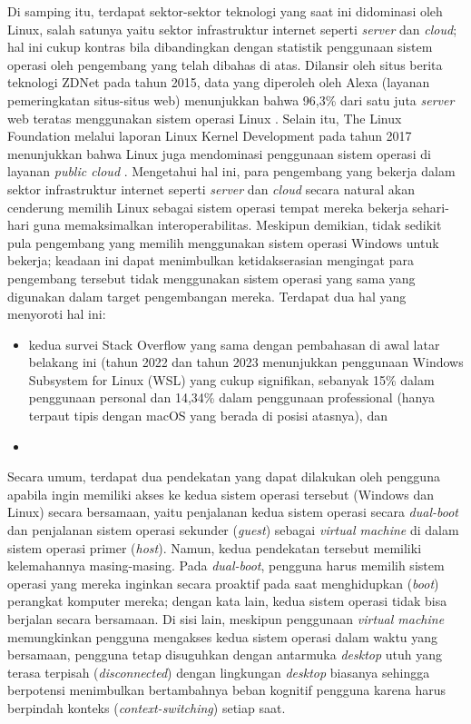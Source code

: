 Di samping itu, terdapat sektor-sektor teknologi yang saat ini didominasi oleh Linux, salah satunya yaitu sektor infrastruktur internet seperti \textit{server} dan \textit{cloud}; hal ini cukup kontras bila dibandingkan dengan statistik penggunaan sistem operasi oleh pengembang yang telah dibahas di atas. Dilansir oleh situs berita teknologi ZDNet pada tahun 2015, data yang diperoleh oleh Alexa (layanan pemeringkatan situs-situs web) menunjukkan bahwa 96,3\% dari satu juta \textit{server} web teratas menggunakan sistem operasi Linux \cite{zdnet-alexa-website-ranking-linux-dominance}. Selain itu, The Linux Foundation melalui laporan Linux Kernel Development pada tahun 2017 menunjukkan bahwa Linux juga mendominasi penggunaan sistem operasi di layanan \textit{public cloud} \cite{linux-dominance-on-public-cloud}. Mengetahui hal ini, para pengembang yang bekerja dalam sektor infrastruktur internet seperti \textit{server} dan \textit{cloud} secara natural akan cenderung memilih Linux sebagai sistem operasi tempat mereka bekerja sehari-hari guna memaksimalkan interoperabilitas. Meskipun demikian, tidak sedikit pula pengembang yang memilih menggunakan sistem operasi Windows untuk bekerja; keadaan ini dapat menimbulkan ketidakserasian mengingat para pengembang tersebut tidak menggunakan sistem operasi yang sama yang digunakan dalam target pengembangan mereka. Terdapat dua hal yang menyoroti hal ini:
\begin{itemize}
    \item kedua survei Stack Overflow yang sama dengan pembahasan di awal latar belakang ini (tahun 2022 \cite{stackoverflow-developer-survey-2022-most-popular-os} dan tahun 2023 \cite{stackoverflow-developer-survey-2023-most-popular-os} menunjukkan penggunaan Windows Subsystem for Linux (WSL) yang cukup signifikan, sebanyak 15\% dalam penggunaan personal dan 14,34\% dalam penggunaan professional (hanya terpaut tipis dengan macOS yang berada di posisi atasnya), dan
    \item 
\end{itemize}

Secara umum, terdapat dua pendekatan yang dapat dilakukan oleh pengguna apabila ingin memiliki akses ke kedua sistem operasi tersebut (Windows dan Linux) secara bersamaan, yaitu penjalanan kedua sistem operasi secara \textit{dual-boot} dan penjalanan sistem operasi sekunder (\textit{guest}) sebagai \textit{virtual machine} di dalam sistem operasi primer (\textit{host}). Namun, kedua pendekatan tersebut memiliki kelemahannya masing-masing. Pada \textit{dual-boot}, pengguna harus memilih sistem operasi yang mereka inginkan secara proaktif pada saat menghidupkan (\textit{boot}) perangkat komputer mereka; dengan kata lain, kedua sistem operasi tidak bisa berjalan secara bersamaan. Di sisi lain, meskipun penggunaan \textit{virtual machine} memungkinkan pengguna mengakses kedua sistem operasi dalam waktu yang bersamaan, pengguna tetap disuguhkan dengan antarmuka \textit{desktop} utuh yang terasa terpisah (\textit{disconnected}) dengan lingkungan \textit{desktop} biasanya sehingga berpotensi menimbulkan bertambahnya beban kognitif pengguna karena harus berpindah konteks (\textit{context-switching}) setiap saat.

